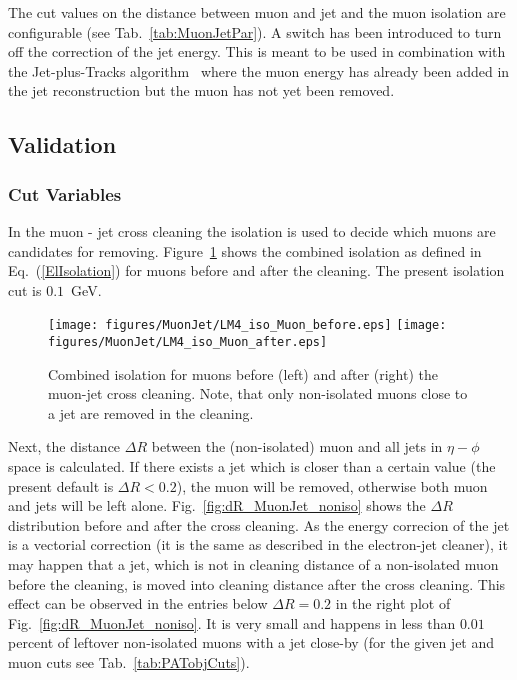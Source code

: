 \documentclass{cmspaper}
\begin{document}
The cut values on the distance between muon and jet and the muon isolation are configurable (see
Tab.~\ref{tab:MuonJetPar}). A switch has been introduced to turn off the
correction of the jet energy. This is meant to be used in combination with the
Jet-plus-Tracks algorithm~\cite{jpt} where the muon energy has already been added in the
jet reconstruction but the muon has not yet been removed.

\subsection{Validation}
\subsubsection{Cut Variables}
In the muon - jet cross cleaning the isolation is used to decide which muons
are candidates for removing. Figure~\ref{fig:MuonIsolation} shows the combined
isolation as defined in Eq.~(\ref{ElIsolation}) for muons before and after the
cleaning. The present isolation cut is $0.1$~GeV. 

\begin{figure}[hb]
\begin{center}
    \texttt{[image: figures/MuonJet/LM4\_iso\_Muon\_before.eps]}
    \texttt{[image: figures/MuonJet/LM4\_iso\_Muon\_after.eps]}
    \caption{Combined isolation for muons before (left) and after (right) the
    muon-jet cross cleaning. Note, that only non-isolated muons close 
    to a jet are removed in the cleaning.}
\label{fig:MuonIsolation}
\end{center}
\end{figure}


Next, the distance \(\Delta R\) between the (non-isolated) muon and all jets in
\(\eta - \phi\) space is calculated. If there exists a jet which is closer than
a certain value (the present default is \(\Delta R < 0.2\)), the muon will be
removed, otherwise both muon and jets will be left alone.
Fig.~\ref{fig:dR_MuonJet_noniso} shows the $\Delta R$ distribution before and
after the cross cleaning. As the energy correcion of the jet is a vectorial
correction (it is the same as described in the electron-jet cleaner), it may
happen that a jet, which is not in cleaning distance of a non-isolated muon
before the cleaning, is moved into cleaning distance after the cross cleaning.
This effect can be observed in the entries below $\Delta R=0.2$ in the right plot of Fig.~\ref{fig:dR_MuonJet_noniso}. It is very small and happens in less than \(0.01\) percent of leftover
non-isolated muons with a jet close-by (for the given jet and muon
cuts see Tab.~\ref{tab:PATobjCuts}).
\end{document}

